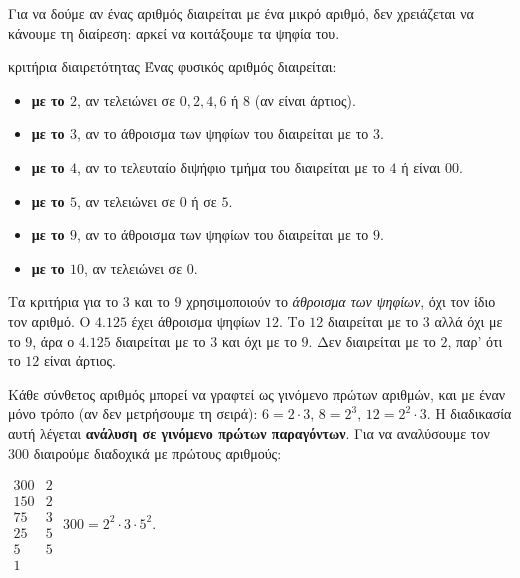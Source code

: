 
Για να δούμε αν ένας αριθμός διαιρείται με ένα μικρό αριθμό, δεν χρειάζεται να κάνουμε τη διαίρεση: αρκεί να κοιτάξουμε τα ψηφία του.

\begin{kanonas}{κριτήρια διαιρετότητας}
Ένας φυσικός αριθμός διαιρείται:
\begin{itemize}[leftmargin=1.2em,itemsep=0.2ex,topsep=2pt]
\item \textbf{με το $2$}, αν τελειώνει σε $0,2,4,6$ ή $8$ (αν είναι άρτιος).
\item \textbf{με το $3$}, αν το άθροισμα των ψηφίων του διαιρείται με το $3$.
\item \textbf{με το $4$}, αν το τελευταίο διψήφιο τμήμα του διαιρείται με το $4$ ή είναι $00$.
\item \textbf{με το $5$}, αν τελειώνει σε $0$ ή σε $5$.
\item \textbf{με το $9$}, αν το άθροισμα των ψηφίων του διαιρείται με το $9$.
\item \textbf{με το $10$}, αν τελειώνει σε $0$.
\end{itemize}
\end{kanonas}

\begin{prosoxi}
Τα κριτήρια για το $3$ και το $9$ χρησιμοποιούν το \emph{άθροισμα των ψηφίων}, όχι τον ίδιο τον αριθμό. Ο $4.125$ έχει άθροισμα ψηφίων $12$. Το $12$ διαιρείται με το $3$ αλλά όχι με το $9$, άρα ο $4.125$ διαιρείται με το $3$ και όχι με το $9$. Δεν διαιρείται με το $2$, παρ' ότι το $12$ είναι άρτιος.
\end{prosoxi}


Κάθε σύνθετος αριθμός μπορεί να γραφτεί ως γινόμενο πρώτων αριθμών, και με έναν μόνο τρόπο (αν δεν μετρήσουμε τη σειρά): $6=2\cdot 3$, $8=2^3$, $12=2^2\cdot 3$. Η διαδικασία αυτή λέγεται \textbf{ανάλυση σε γινόμενο πρώτων παραγόντων}. Για να αναλύσουμε τον $300$ διαιρούμε διαδοχικά με πρώτους αριθμούς:

\begin{center}
\renewcommand{\arraystretch}{1.15}
$\begin{array}{r|l}
300 & 2\\ 150 & 2\\ 75 & 3\\ 25 & 5\\ 5 & 5\\ 1 &
\end{array}$
\qquad\qquad $300=2^2\cdot 3\cdot 5^2$.
\end{center}

